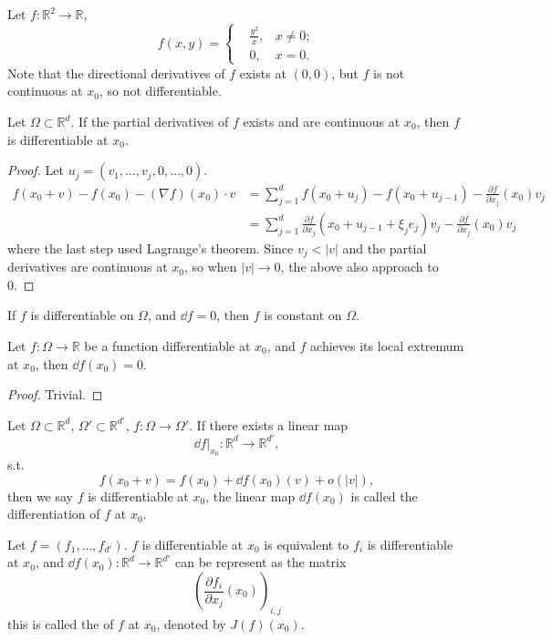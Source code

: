 \begin{example}
    Let $f: \mathbb{R}^2\to \mathbb{R}$,
	\[
	f(x,y) = \left\{
	\begin{aligned}
		&\frac{y^2}{x}, &x\ne 0;\\
		&0, &x = 0.
	\end{aligned}\right.
	\]
	Note that the directional derivatives of $f$ exists at $(0,0)$, but
	$f$ is not continuous at $x_0$, so not differentiable.
\end{example}

\begin{theorem}
    Let $\Omega \subset \mathbb{R}^{d}$.
	If the partial derivatives of $f$ exists and are continuous at $x_0$,
	then $f$ is differentiable at $x_0$.
\end{theorem}
\begin{proof}[Proof]
    Let $u_j = (v_1,\dots,v_j,0,\dots,0)$.
	\begin{align*}
	f(x_0+v) - f(x_0) - (\nabla f)(x_0)\cdot v
	&= \sum_{j=1}^{d} f(x_0+u_j) - f(x_0 + u_{j-1})
	- \frac{\partial f}{\partial x_j}(x_0)v_j\\
	&= \sum_{j=1}^{d} \frac{\partial f}{\partial x_j}(x_0 + u_{j-1} + \xi_je_j)v_j
	- \frac{\partial f}{\partial x_j}(x_0)v_j
	\end{align*}
	where the last step used Lagrange's theorem.
	Since $v_j < |v|$ and the partial derivatives are continuous at $x_0$,
	so when $|v|\to 0$, the above also approach to 0.
\end{proof}

\begin{corollary}
    If $f$ is differentiable on $\Omega$, and  $\dd f = 0$, then
	$f$ is constant on $\Omega$.
\end{corollary}
\begin{proposition}
	Let $f: \Omega \to \mathbb{R}$ be a function differentiable at $x_0$,
	and $f$ achieves its local extremum at $x_0$, then $\dd f(x_0) = 0$.
\end{proposition}
\begin{proof}[Proof]
    Trivial.
\end{proof}

\begin{definition}
	Let $\Omega \subset \mathbb{R}^{d}$, $\Omega' \subset \mathbb{R}^{d'}$,
	$f: \Omega\to \Omega'$. If there exists a linear map
	\[
	\dd f\big|_{x_0} : \mathbb{R}^{d}\to \mathbb{R}^{d'},
	\]
	s.t.
	\[
	f(x_0+v) = f(x_0) + \dd f(x_0)(v) + o(|v|),
	\]
	then we say $f$ is differentiable at $x_0$, the linear map $\dd f(x_0)$ is
	called the differentiation of $f$ at $x_0$.
\end{definition}

\begin{proposition}
	Let $f = (f_1,\dots, f_{d'})$.
	$f$ is differentiable at $x_0$ is equivalent to $f_i$ is differentiable at $x_0$,
	and $\dd f(x_0): \mathbb{R}^{d}\to \mathbb{R}^{d'}$ can be represent as the matrix
	\[
		\left(\frac{\partial f_i}{\partial x_j}(x_0)\right)_{i,j}
	\]
	this is called the  of $f$ at $x_0$, denoted by $J(f)(x_0)$.
\end{proposition}
